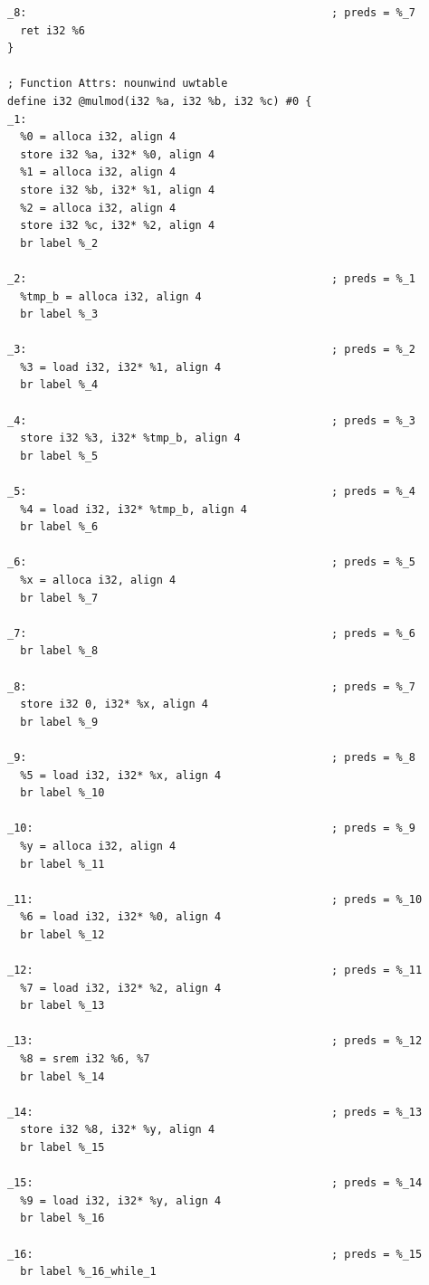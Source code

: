 \documentclass[12pt,a4paper]{article}
\begin{document}
\begin{verbatim}
_8:                                               ; preds = %_7
  ret i32 %6
}

; Function Attrs: nounwind uwtable
define i32 @mulmod(i32 %a, i32 %b, i32 %c) #0 {
_1:
  %0 = alloca i32, align 4
  store i32 %a, i32* %0, align 4
  %1 = alloca i32, align 4
  store i32 %b, i32* %1, align 4
  %2 = alloca i32, align 4
  store i32 %c, i32* %2, align 4
  br label %_2

_2:                                               ; preds = %_1
  %tmp_b = alloca i32, align 4
  br label %_3

_3:                                               ; preds = %_2
  %3 = load i32, i32* %1, align 4
  br label %_4

_4:                                               ; preds = %_3
  store i32 %3, i32* %tmp_b, align 4
  br label %_5

_5:                                               ; preds = %_4
  %4 = load i32, i32* %tmp_b, align 4
  br label %_6

_6:                                               ; preds = %_5
  %x = alloca i32, align 4
  br label %_7

_7:                                               ; preds = %_6
  br label %_8

_8:                                               ; preds = %_7
  store i32 0, i32* %x, align 4
  br label %_9

_9:                                               ; preds = %_8
  %5 = load i32, i32* %x, align 4
  br label %_10

_10:                                              ; preds = %_9
  %y = alloca i32, align 4
  br label %_11

_11:                                              ; preds = %_10
  %6 = load i32, i32* %0, align 4
  br label %_12

_12:                                              ; preds = %_11
  %7 = load i32, i32* %2, align 4
  br label %_13

_13:                                              ; preds = %_12
  %8 = srem i32 %6, %7
  br label %_14

_14:                                              ; preds = %_13
  store i32 %8, i32* %y, align 4
  br label %_15

_15:                                              ; preds = %_14
  %9 = load i32, i32* %y, align 4
  br label %_16

_16:                                              ; preds = %_15
  br label %_16_while_1


\end{verbatim}
\end{document}
